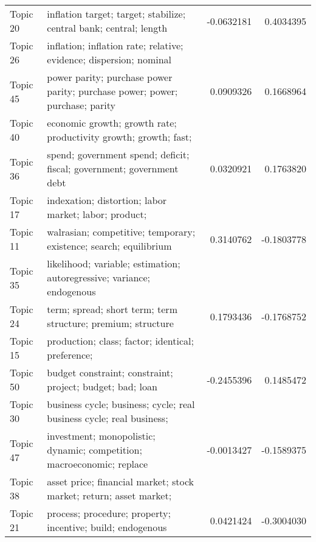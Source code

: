 \documentclass[
  12pt,
  onecolumn]{article}
\begin{document}
\begin{longtable}[t]{llrr}
\addlinespace
Topic 20 & inflation
target;
target;
stabilize;
central
bank;
central;
length & -0.0632181 & 0.4034395\\
Topic 26 & inflation;
inflation
rate;
relative;
evidence;
dispersion;
nominal
\cellcolor{gray!6}{price} & \cellcolor{gray!6}{0.2682666} & \cellcolor{gray!6}{0.0646658}\\
Topic 45 & power
parity;
purchase
power
parity;
purchase
power;
power;
purchase;
parity & 0.0909326 & 0.1668964\\
Topic 40 & economic
growth;
growth
rate;
productivity
growth;
growth;
fast;
\cellcolor{gray!6}{region} & \cellcolor{gray!6}{0.1981467} & \cellcolor{gray!6}{0.0580332}\\
Topic 36 & spend;
government
spend;
deficit;
fiscal;
government;
government
debt & 0.0320921 & 0.1763820\\
\addlinespace
Topic 17 & indexation;
distortion;
labor
market;
labor;
product;
\cellcolor{gray!6}{corporate} & \cellcolor{gray!6}{-0.2943298} & \cellcolor{gray!6}{0.4335662}\\
Topic 11 & walrasian;
competitive;
temporary;
existence;
search;
equilibrium & 0.3140762 & -0.1803778\\
Topic 35 & likelihood;
variable;
estimation;
autoregressive;
variance;
endogenous
\cellcolor{gray!6}{variable} & \cellcolor{gray!6}{0.1599255} & \cellcolor{gray!6}{-0.1268647}\\
Topic 24 & term;
spread;
short
term;
term
structure;
premium;
structure & 0.1793436 & -0.1768752\\
Topic 15 & production;
class;
factor;
identical;
preference;
\cellcolor{gray!6}{input} & \cellcolor{gray!6}{0.1209233} & \cellcolor{gray!6}{-0.1515574}\\
\addlinespace
Topic 50 & budget
constraint;
constraint;
project;
budget;
bad;
loan & -0.2455396 & 0.1485472\\
Topic 30 & business
cycle;
business;
cycle;
real
business
cycle;
real
business;
\cellcolor{gray!6}{volatility} & \cellcolor{gray!6}{-0.1120082} & \cellcolor{gray!6}{-0.0337743}\\
Topic 47 & investment;
monopolistic;
dynamic;
competition;
macroeconomic;
replace & -0.0013427 & -0.1589375\\
Topic 38 & asset
price;
financial
market;
stock
market;
return;
asset
market;
\cellcolor{gray!6}{stock} & \cellcolor{gray!6}{-0.2568392} & \cellcolor{gray!6}{0.0039660}\\
Topic 21 & process;
procedure;
property;
incentive;
build;
endogenous & 0.0421424 & -0.3004030\\

\end{longtable}
\end{document}

